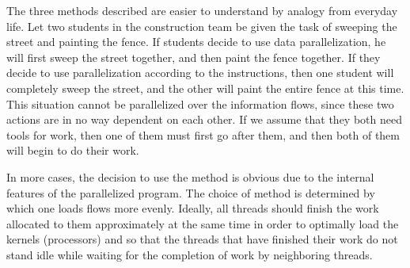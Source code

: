 {	\par The three methods described are easier to understand by analogy from everyday life. Let two students in the construction team be given the task of sweeping the street and painting the fence. If students decide to use data parallelization, he will first sweep the street together, and then paint the fence together. If they decide to use parallelization according to the instructions, then one student will completely sweep the street, and the other will paint the entire fence at this time. This situation cannot be parallelized over the information flows, since these two actions are in no way dependent on each other. If we assume that they both need tools for work, then one of them must first go after them, and then both of them will begin to do their work.
	\par In more cases, the decision to use the method is obvious due to the internal features of the parallelized program. The choice of method is determined by which one loads flows more evenly. Ideally, all threads should finish the work allocated to them approximately at the same time in order to optimally load the kernels (processors) and so that the threads that have finished their work do not stand idle while waiting for the completion of work by neighboring threads.
	\par
}
